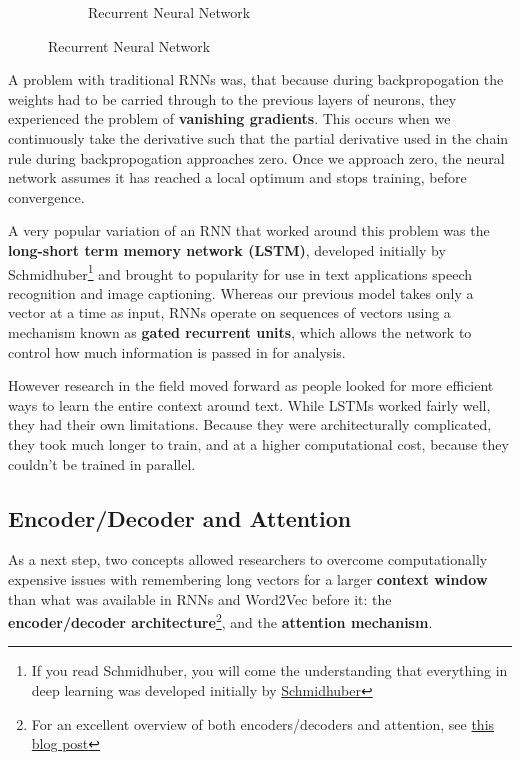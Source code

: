 \documentclass[11pt, table]{diazessay} %
\begin{document}
\begin{sloppypar}
\begin{figure}[H]
\begin{subfigure}[b]{0.4\linewidth}
\begin{tikzpicture}
\end{tikzpicture}
\caption{Recurrent Neural Network}
\end{subfigure}
\end{figure}

A problem with traditional RNNs was, that because during backpropogation the weights had to be carried through to the previous layers of neurons, they experienced the problem of \textbf{vanishing gradients}. This occurs when we continuously take the derivative such that the partial derivative used in the chain rule during backpropogation approaches zero. Once we approach zero, the neural network assumes it has reached a local optimum and stops training, before convergence. 

A very popular variation of an RNN that worked around this problem was the \textbf{long-short term memory network (LSTM)}, developed initially by Schmidhuber\footnote{If you read Schmidhuber, you will come the understanding that everything in deep learning was developed initially by \href{https://people.idsia.ch/~juergen/deep-learning-miraculous-year-1990-1991.html}{Schmidhuber}} and brought to popularity for use in text applications speech recognition and image captioning\citep{karpathy_2015}.  Whereas our previous model takes only a vector at a time as input, RNNs operate on sequences of vectors using a mechanism known as \textbf{gated recurrent units}, which allows the network to control how much information is passed in for analysis. 

However research in the field moved forward as people looked for more efficient ways to learn the entire context around text. While LSTMs worked fairly well, they had their own limitations. Because they were architecturally complicated, they took much longer to train, and at a higher computational cost, because they couldn't be trained in parallel. 


\subsection{Encoder/Decoder and Attention}
As a next step, two concepts allowed researchers to overcome computationally expensive issues with remembering long vectors for a larger \textbf{context window} than what was available in RNNs and Word2Vec before it: the \textbf{encoder/decoder architecture}\footnote{For an excellent overview of both encoders/decoders and attention, see  \href{https://lilianweng.github.io/posts/2018-06-24-attention/}{this blog post}}, and the \textbf{attention mechanism}. 


\end{sloppypar}
\end{document}
